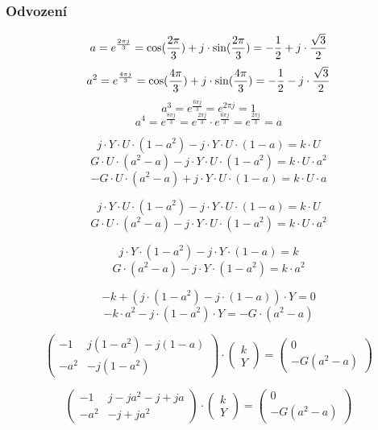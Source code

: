 \documentclass{article}
\begin{document}
\subsubsection{Odvození \spicy \spicy \spicy \spicy}
$$
    a = e^{\frac{2 \pi j}{3}} = \textrm{cos}(\frac{2 \pi}{3}) + j \cdot \textrm{sin}(\frac{2 \pi}{3}) = -\frac{1}{2} + j \cdot \frac{\sqrt{3}}{2}
$$
$$
    a^2 = e^{\frac{4 \pi j}{3}} = \textrm{cos}(\frac{4 \pi}{3}) + j \cdot \textrm{sin}(\frac{4 \pi}{3}) = -\frac{1}{2} - j \cdot \frac{\sqrt{3}}{2}
$$
$$
    a^3 = e^{\frac{6 \pi j}{3}} = e^{2 \pi j} = 1
$$
$$
    a^4 = e^{\frac{8 \pi j}{3}} = e^{\frac{2 \pi j}{3}} \cdot e^{\frac{6 \pi j}{3}} = e^{\frac{2 \pi j}{3}} = a
$$

$$
    j \cdot Y \cdot U \cdot (1 - a^2) - j \cdot Y \cdot U \cdot (1 - a) = k \cdot U
$$
$$
    G \cdot U \cdot (a^2 - a) - j \cdot Y \cdot U \cdot (1 - a^2) = k \cdot U \cdot a^2
$$
$$
    -G \cdot U \cdot (a^2 - a) + j \cdot Y \cdot U \cdot (1 - a) = k \cdot U \cdot a
$$

$$
    j \cdot Y \cdot U \cdot (1 - a^2) - j \cdot Y \cdot U \cdot (1 - a) = k \cdot U
$$
$$
    G \cdot U \cdot (a^2 - a) - j \cdot Y \cdot U \cdot (1 - a^2) = k \cdot U \cdot a^2
$$

$$
    j \cdot Y \cdot (1 - a^2) - j \cdot Y \cdot (1 - a) = k
$$
$$
    G \cdot (a^2 - a) - j \cdot Y \cdot (1 - a^2) = k \cdot a^2
$$

$$
    -k + \left( j \cdot (1 - a^2) - j \cdot (1 - a) \right) \cdot Y = 0
$$
$$
    -k \cdot a^2 - j \cdot (1 - a^2) \cdot Y = -G \cdot (a^2 - a)
$$

$$
    \begin{pmatrix}
        -1   & j (1 - a^2) - j (1 - a) \\
        -a^2 & - j (1 - a^2)
    \end{pmatrix}
    \cdot
    \begin{pmatrix}
        k \\
        Y
    \end{pmatrix}
    =
    \begin{pmatrix}
        0 \\
        -G (a^2 - a)
    \end{pmatrix}
$$

$$
    \begin{pmatrix}
        -1   & j - j a^2 - j + j a \\
        -a^2 & - j + j a^2
    \end{pmatrix}
    \cdot
    \begin{pmatrix}
        k \\
        Y
    \end{pmatrix}
    =
    \begin{pmatrix}
        0 \\
        - G (a^2 - a)
    \end{pmatrix}
$$
\end{document}
